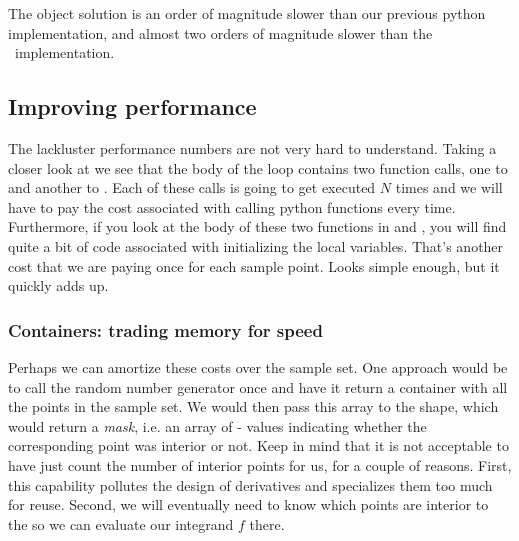 %
The object solution is an order of magnitude slower than our previous python implementation,
and almost two orders of magnitude slower than the \cpp\ implementation. 


\subsection{Improving performance}
\label{sec:classes:improved-performane}

The lackluster performance numbers are not very hard to understand. Taking a closer look at
 we see that the body of the loop contains two function calls, one to
 and another to . Each of these calls is going
to get executed $N$ times and we will have to pay the cost associated with calling python
functions every time. Furthermore, if you look at the body of these two functions in
 and , you will find quite a bit of code associated
with initializing the local variables. That's another cost that we are paying once for each
sample point. Looks simple enough, but it quickly adds up.

\subsubsection{Containers: trading memory for speed}
\label{sec:classes:containers}

Perhaps we can amortize these costs over the sample set. One approach would be to call the
random number generator once and have it return a container with all the points in the sample
set. We would then pass this array to the shape, which would return a {\em mask}, i.e. an array
of - values indicating whether the corresponding point was
interior or not. Keep in mind that it is not acceptable to have  just count
the number of interior points for us, for a couple of reasons. First, this capability pollutes
the design of  derivatives and specializes them too much for reuse. Second, we
will eventually need to know which points are interior to the  so we can evaluate
our integrand $f$ there.


